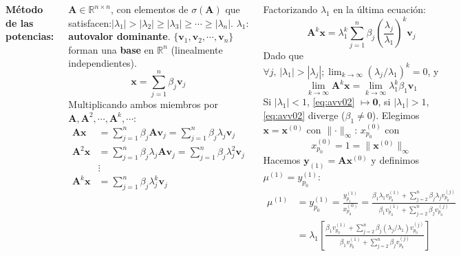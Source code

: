 \documentclass[9pt, aspectratio=169]{beamer}
\begin{document}
\begin{frame}
\begin{columns}[t]
\cx
\textbf{Método de las potencias:}

$\bm{A} \in \mathbb{R}^{n \times n}$, con elementos de $\sigma(\bm{A})$ que satisfacen:$|\lambda_1| > |\lambda_2| \geq |\lambda_3| \geq \cdots \geq |\lambda_n|$. $\lambda_1$: \textbf{autovalor dominante}. $\{ \bm{v}_1, \bm{v}_2, \cdots,\bm{v}_n \}$ forman una \textbf{base} en $\mathbb{R}^n$ (linealmente independientes).
\[ \bm{x} = \sum_{j=1}^n \beta_j \bm{v}_j \]
Multiplicando ambos miembros por $\bm{A}, \bm{A}^2, \cdots, \bm{A}^k, \cdots$:
\begin{align*}
    \bm{A} \bm{x} &= \sum_{j=1}^n \beta_j \bm{A} \bm{v}_j = \sum_{j=1}^n \beta_j \lambda_j \bm{v}_j \\ 
    \bm{A}^2 \bm{x} &= \sum_{j=1}^n \beta_j \lambda_j \bm{A} \bm{v}_j = \sum_{j=1}^n \beta_j \lambda_j^2 \bm{v}_j \\ 
                    &\vdots \\
    \bm{A}^k \bm{x} &= \sum_{j=1}^n \beta_j \lambda_j^k \bm{v}_j \\ 
\end{align*}
 
\cx
Factorizando $\lambda_1$ en la última ecuación:
\[ \bm{A}^k \bm{x} = \lambda_1^k \sum_{j=1}^n \beta_j \left(\frac{\lambda_j}{\lambda_1}\right)^k \bm{v}_j \]
Dado que $\forall j, \,|\lambda_1| > |\lambda_j|; \lim_{k \rightarrow \infty} (\lambda_j/\lambda_1)^k = 0$, y
\begin{equation} \lim_{k \rightarrow \infty} \bm{A}^k \bm{x} = \lim_{k \rightarrow \infty} \lambda_1^k \beta_1 \bm{v}_1 \label{eq:avv02} \end{equation}
Si $|\lambda_1| < 1$, \eqref{eq:avv02} $\mapsto \bm{0}$, si $|\lambda_1| > 1$, \eqref{eq:avv02} diverge ($\beta_1 \neq 0$). Elegimos $\bm{x} = \bm{x}^{(0)}$ con $\lVert \cdot \rVert_{\infty}$: $x_{p_0}^{(0)}$ con 
\[ x_{p_0}^{(0)} = 1 = \lVert \bm{x}^{(0)} \rVert_{\infty} \]
Hacemos $\bm{y}_{(1)} = \bm{A} \bm{x}^{(0)}$ y definimos $\mu^{(1)} = y_{p_0}^{(1)}$:
\begin{align*}
    \mu^{(1)} &= y_{p_0}^{(1)} = \frac{y_{p_1}^{(1)}}{x_{p_0}^{(0)}} = \frac{\beta_1 \lambda_1 v_{p_0}^{(1)} + \sum_{j=2}^n \beta_j \lambda_j v_{p_0}^{(j)}}{\beta_1 v_{p_0}^{(1)} + \sum_{j=2}^n \beta_j v_{p_0}^{(j)}} \\
              &= \lambda_1 \left[ \frac{\beta_1 v_{p_0}^{(1)} + \sum_{j=2}^n \beta_j (\lambda_j/\lambda_1) v_{p_0}^{(j)}}{\beta_1 v_{p_0}^{(1)} + \sum_{j=2}^n \beta_j v_{p_0}^{(j)}} \right]
\end{align*}
\end{columns}
\end{frame}
\end{document}
